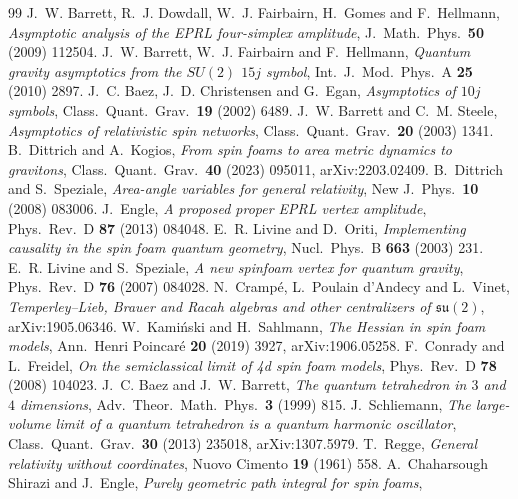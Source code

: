 \documentclass[11pt]{article}
\numberwithin{equation}{section}
\theoremstyle{definition}
\theoremstyle{remark}
\begin{document}
\begin{thebibliography}{99}
 J.~W. Barrett, R.~J. Dowdall, W.~J. Fairbairn,
H.~Gomes and F.~Hellmann, \emph{Asymptotic analysis of the EPRL four-simplex
amplitude}, J.\ Math.\ Phys.\ \textbf{50} (2009) 112504.
 J.~W. Barrett, W.~J. Fairbairn and F.~Hellmann,
\emph{Quantum gravity asymptotics from the $SU(2)$ $15j$ symbol},
Int.\ J.\ Mod.\ Phys.\ A \textbf{25} (2010) 2897.
 J.~C. Baez, J.~D. Christensen and G.~Egan,
\emph{Asymptotics of $10j$ symbols}, Class.\ Quant.\ Grav.\ \textbf{19} (2002) 6489.
 J.~W. Barrett and C.~M. Steele,
\emph{Asymptotics of relativistic spin networks},
Class.\ Quant.\ Grav.\ \textbf{20} (2003) 1341.
 B.~Dittrich and A.~Kogios,
\emph{From spin foams to area metric dynamics to gravitons},
Class.\ Quant.\ Grav.\ \textbf{40} (2023) 095011, arXiv:2203.02409.
 B.~Dittrich and S.~Speziale,
\emph{Area-angle variables for general relativity},
New J.\ Phys.\ \textbf{10} (2008) 083006.
 J.~Engle,
\emph{A proposed proper EPRL vertex amplitude},
Phys.\ Rev.\ D \textbf{87} (2013) 084048.
 E.~R. Livine and D.~Oriti,
\emph{Implementing causality in the spin foam quantum geometry},
Nucl.\ Phys.\ B \textbf{663} (2003) 231.
 E.~R. Livine and S.~Speziale,
\emph{A new spinfoam vertex for quantum gravity},
Phys.\ Rev.\ D \textbf{76} (2007) 084028.
 N.~Crampé, L.~Poulain d'Andecy and L.~Vinet,
\emph{Temperley--Lieb, Brauer and Racah algebras and other centralizers of
$\mathfrak{su}(2)$}, arXiv:1905.06346.
 W.~Kamiński and H.~Sahlmann,
\emph{The Hessian in spin foam models},
Ann.\ Henri Poincaré \textbf{20} (2019) 3927, arXiv:1906.05258.
 F.~Conrady and L.~Freidel,
\emph{On the semiclassical limit of 4d spin foam models},
Phys.\ Rev.\ D \textbf{78} (2008) 104023.
 J.~C. Baez and J.~W. Barrett,
\emph{The quantum tetrahedron in $3$ and $4$ dimensions},
Adv.\ Theor.\ Math.\ Phys.\ \textbf{3} (1999) 815.
 J.~Schliemann,
\emph{The large-volume limit of a quantum tetrahedron is a quantum harmonic
oscillator}, Class.\ Quant.\ Grav.\ \textbf{30} (2013) 235018, arXiv:1307.5979.
 T.~Regge,
\emph{General relativity without coordinates},
Nuovo Cimento \textbf{19} (1961) 558.
 A.~Chaharsough Shirazi and J.~Engle,
\emph{Purely geometric path integral for spin foams},

\end{thebibliography}
\end{document}
